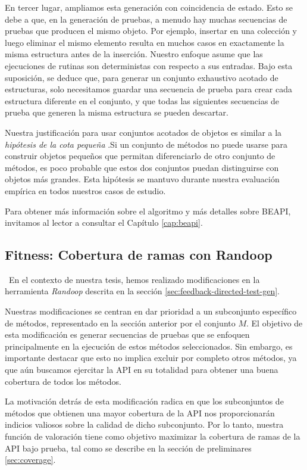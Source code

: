 En tercer lugar, ampliamos esta generación con coincidencia de estado. Esto se debe a que, en la generación de pruebas, a menudo hay muchas secuencias de pruebas que producen el mismo objeto. Por ejemplo, insertar en una colección y luego eliminar el mismo elemento resulta en muchos casos en exactamente la misma estructura antes de la inserción. Nuestro enfoque asume que las ejecuciones de rutinas son deterministas con respecto a sus entradas. Bajo esta suposición, se deduce que, para generar un conjunto exhaustivo acotado de estructuras, solo necesitamos guardar una secuencia de prueba para crear cada estructura diferente en el conjunto, y que todas las siguientes secuencias de prueba que generen la misma estructura se pueden descartar.

Nuestra justificación para usar conjuntos acotados de objetos es similar a la \emph{hipótesis de la cota pequeña} \cite{Andoni:2003}.Si un conjunto de métodos no puede usarse para construir objetos pequeños que permitan diferenciarlo de otro conjunto de métodos, es poco probable que estos dos conjuntos puedan distinguirse con objetos más grandes. Esta hipótesis se mantuvo durante nuestra evaluación empírica en todos nuestros casos de estudio.

Para obtener más información sobre el algoritmo y más detalles sobre BEAPI, invitamos al lector a consultar el Capítulo \ref{cap:beapi}.


\subsection{Fitness: Cobertura de ramas con Randoop}
\
En el contexto de nuestra tesis, hemos realizado modificaciones en la herramienta \emph{Randoop} descrita en la sección \ref{sec:feedback-directed-test-gen}.

Nuestras modificaciones se centran en dar prioridad a un subconjunto específico de métodos, representado en la sección anterior por el conjunto $M$. El objetivo de esta modificación es generar secuencias de pruebas que se enfoquen principalmente en la ejecución de estos métodos seleccionados. Sin embargo, es importante destacar que esto no implica excluir por completo otros métodos, ya que aún buscamos ejercitar la API en su totalidad para obtener una buena cobertura de todos los métodos.

La motivación detrás de esta modificación radica en que los subconjuntos de métodos que obtienen una mayor cobertura de la API nos proporcionarán indicios valiosos sobre la calidad de dicho subconjunto. Por lo tanto, nuestra función de valoración tiene como objetivo maximizar la cobertura de ramas de la API bajo prueba, tal como se describe en la sección de preliminares \ref{sec:coverage}.

